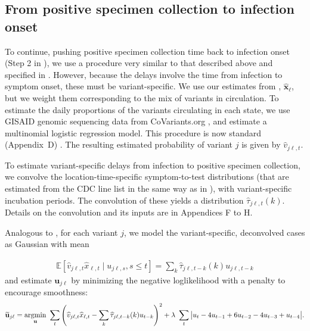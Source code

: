 \subsection{From positive specimen collection to infection onset}
\label{sec:step2-and-3}


To continue, pushing positive specimen collection time back to infection onset
(Step 2 in ), we use a procedure very
similar to that described above and specified in
. However, because
the delays involve the time from infection to symptom onset, these must be
variant-specific.
We use our estimates from ,
$\widehat{\mathbf{x}}_\ell$, but we weight them corresponding to the mix of
variants in circulation. To estimate the daily proportions of the variants
circulating in each state, we use GISAID genomic sequencing data from
CoVariants.org \citep{hodcroft2021covariants, elbe2017data}, and estimate a
multinomial logistic regression model. This procedure is now standard
(Appendix~D)
\citep{obermeyer2022analysis, annavajhala2021emergence, figgins2021sars}.
The resulting
estimated probability of variant $j$ is given by $\hat{v}_{j\ell,t}$.

To estimate variant-specific delays from infection to positive specimen
collection, we convolve the location-time-specific symptom-to-test distributions
(that are estimated from the CDC line list in the same way as in
), with variant-specific incubation periods. The convolution of
these yields a distribution $\widehat{\tau}_{j\ell,t}(k)$. Details on the
convolution and its inputs are in Appendices F to H. 

\begin{linenomath*} 
Analogous to , for each variant $j$,
we model the variant-specific, deconvolved cases as Gaussian with mean
\end{linenomath*} 
\begin{linenomath*} 
\begin{align}
  \mathbb{E}\left[\widehat{v}_{j\ell,t}\widehat{x}_{\ell,t} \mid u_{j\ell,s}, s \leq t  \right] = \sum_k \widehat{\tau}_{j\ell,t-k}(k) u_{j\ell,t-k} 
\end{align}
and estimate $\mathbf{u}_{j\ell}$ by minimizing the negative loglikelihood with
a penalty to encourage smoothness:
\begin{align}
\widetilde{\mathbf{u}}_{j\ell} = \operatorname*{argmin}_{\mathbf{u}}\ \sum_{t} 
\left( 
    \widehat{v}_{j\ell,t} \widehat{x}_{\ell,t} -  
    \sum_k \widehat{\tau}_{j\ell,t-k}(k) u_{t-k} 
\right)^2 
+ \lambda\ \sum_{t} \big|u_{t} - 4u_{t-1} + 6u_{t-2} -4u_{t-3}+ u_{t-4}\big|.
\end{align} 
\end{linenomath*} 

